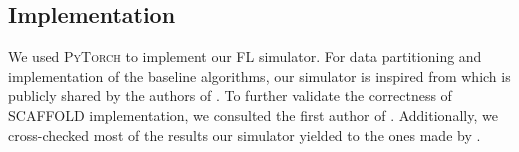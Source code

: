 \documentclass[runningheads]{llncs}
\newcommand{\scaffold}{\textsc{SCAFFOLD}\xspace}
\begin{document}
\subsection{Implementation}
We used \textsc{PyTorch} to implement our FL simulator.
For data partitioning and implementation of the baseline algorithms, our simulator is
inspired from \cite{feddynacar} which is publicly shared by the authors of
\cite{acar2021federated}.
To further validate the correctness of \scaffold implementation, we consulted the first author of \cite{karimireddy2020scaffold}. Additionally, we cross-checked most of the results our simulator yielded to the ones made by \cite{feddynacar}. 


\begin{figure}[tbh!]
  \centering
  \def\svgwidth{12.0cm}
  \begingroup \makeatletter \providecommand{}\providecommand{}\providecommand{}\newcommand*{}\newcommand*\lineheight[1]{\fontsize{\fsize}{#1\fsize}\selectfont}\ifx\svgwidth\undefined \setlength{\unitlength}{505.09689331bp}\ifx\svgscale\undefined \relax \else \setlength{\unitlength}{\unitlength * \real{\svgscale}}\fi \else \setlength{\unitlength}{\svgwidth}\fi \global\let\svgwidth\undefined \global\let\svgscale\undefined \makeatother 
\end{figure}
\end{document}
